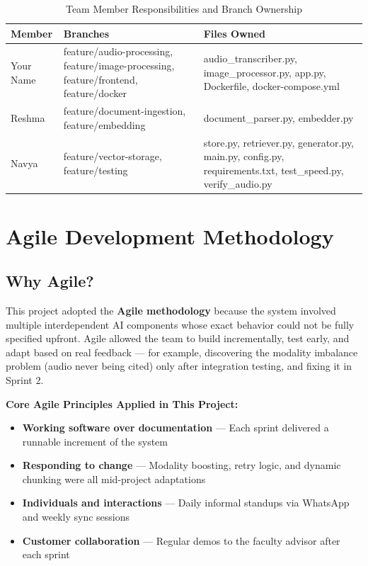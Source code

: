 \documentclass[12pt,a4paper]{report}
\begin{document}
\begin{table}[H]
\centering
\caption{Team Member Responsibilities and Branch Ownership}
\begin{tabular}{p{2.5cm}p{4cm}p{6cm}}
\toprule
\textbf{Member} & \textbf{Branches} & \textbf{Files Owned} \\
\midrule
Your Name & feature/audio-processing, feature/image-processing, feature/frontend, feature/docker &
audio\_transcriber.py, image\_processor.py, app.py, Dockerfile, docker-compose.yml \\
\midrule
Reshma & feature/document-ingestion, feature/embedding &
document\_parser.py, embedder.py \\
\midrule
Navya & feature/vector-storage, feature/testing &
store.py, retriever.py, generator.py, main.py, config.py, requirements.txt, test\_speed.py, verify\_audio.py \\
\bottomrule
\end{tabular}
\end{table}

\chapter{Agile Development Methodology}

\section{Why Agile?}

This project adopted the \textbf{Agile methodology} because the system involved multiple interdependent AI components whose exact behavior could not be fully specified upfront. Agile allowed the team to build incrementally, test early, and adapt based on real feedback --- for example, discovering the modality imbalance problem (audio never being cited) only after integration testing, and fixing it in Sprint 2.

\begin{mdframed}[style=agilebox]
\textbf{Core Agile Principles Applied in This Project:}
\begin{itemize}[leftmargin=1.5cm]
    \item \textbf{Working software over documentation} --- Each sprint delivered a runnable increment of the system
    \item \textbf{Responding to change} --- Modality boosting, retry logic, and dynamic chunking were all mid-project adaptations
    \item \textbf{Individuals and interactions} --- Daily informal standups via WhatsApp and weekly sync sessions
    \item \textbf{Customer collaboration} --- Regular demos to the faculty advisor after each sprint
\end{itemize}
\end{mdframed}
\end{document}
